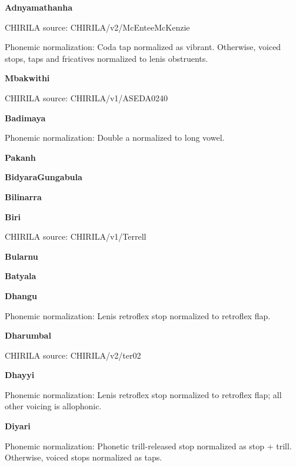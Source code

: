 \textbf{Adnyamathanha}

CHIRILA source: CHIRILA/v2/McEnteeMcKenzie


Phonemic normalization: Coda tap normalized as vibrant. Otherwise,
voiced stops, taps and fricatives normalized to lenis obstruents.

\textbf{Mbakwithi}

CHIRILA source: CHIRILA/v1/ASEDA0240


\textbf{Badimaya}


Phonemic normalization: Double a normalized to long vowel.

\textbf{Pakanh}


\textbf{BidyaraGungabula}


\textbf{Bilinarra}


\textbf{Biri}

CHIRILA source: CHIRILA/v1/Terrell


\textbf{Bularnu}


\textbf{Batyala}


\textbf{Dhangu}


Phonemic normalization: Lenis retroflex stop normalized to retroflex
flap.

\textbf{Dharumbal}

CHIRILA source: CHIRILA/v2/ter02


\textbf{Dhayyi}


Phonemic normalization: Lenis retroflex stop normalized to retroflex
flap; all other voicing is allophonic.

\textbf{Diyari}


Phonemic normalization: Phonetic trill-released stop normalized as stop
+ trill. Otherwise, voiced stops normalized as taps.

